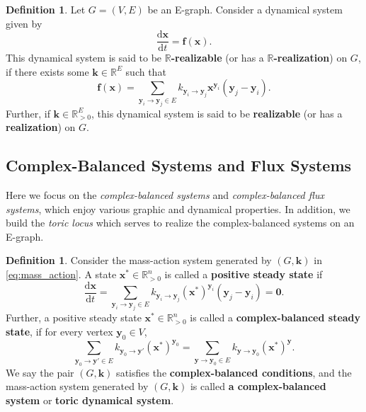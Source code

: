 \documentclass[11pt]{article}
\theoremstyle{plain}
\theoremstyle{definition}
\newtheorem{definition}[theorem]{Definition}
\theoremstyle{remark}
\newcommand\RR{\mathbb{R}}
\newcommand\by{\boldsymbol{y}}
\renewcommand\bf{\boldsymbol{f}}
\newcommand\bk{\boldsymbol{k}}
\newcommand\bx{\boldsymbol{x}}
\newcommand{\defi}{\textbf}
\begin{document}
\begin{definition} 
\label{def:mas_realizable}
Let $G=(V, E)$ be an E-graph.
Consider a dynamical system given by
\begin{equation} \label{eq:realization_ode}
\frac{\mathrm{d} \bx}{\mathrm{d} t} 
= \bf (\bx).
\end{equation}
This dynamical system is said to be \defi{$\RR$-realizable} (or has a \defi{$\RR$-realization}) on $G$, if there exists some $\bk \in \mathbb{R}^{E}$ such that
\begin{equation} \label{eq:realization}
\bf (\bx) =
\sum_{\by_i \rightarrow \by_j \in E}k_{\by_i \rightarrow \by_j} \bx^{\by_i}(\by_j - \by_i).
\end{equation}
Further, if $\bk \in \mathbb{R}^{E}_{>0}$, this dynamical system is said to be \defi{realizable} (or has a \defi{realization}) on $G$.
\end{definition}

\subsection{Complex-Balanced Systems and Flux Systems}
\label{sec:complex_balanced}

Here we focus on the \emph{complex-balanced systems} and \emph{complex-balanced flux systems}, which enjoy various graphic and dynamical properties. In addition, we build the \emph{toric locus} which serves to realize the complex-balanced systems on an E-graph.

\begin{definition} 
\label{def:cb_system}
Consider the mass-action system generated by $(G, \bk)$ in \eqref{eq:mass_action}.
A state $\bx^* \in \mathbb{R}_{>0}^n$ is called a \defi{positive steady state} if 
\begin{equation} 
\frac{\mathrm{d} \bx}{\mathrm{d} t} 
= \sum_{\by_i \rightarrow \by_j \in E}k_{\by_i \rightarrow \by_j} (\bx^*)^{\by_i}(\by_j - \by_i)
= \mathbf{0}.
\end{equation}
Further, a positive steady state $\bx^* \in \RR_{>0}^n$ is called a \defi{complex-balanced steady state}, if for every vertex $\by_0 \in V$,
\begin{equation} 
\sum_{\by_0 \to \by' \in E} k_{\by_0 \to \by'} (\bx^*)^{\by_0}
= \sum_{\by \to \by_0 \in E} k_{\by \to \by_0}
(\bx^*)^{\by}.
\end{equation}
We say the pair $(G, \bk)$ satisfies the \defi{complex-balanced conditions}, and the mass-action system generated by $(G, \bk)$ is called \defi{a complex-balanced system} or \defi{toric dynamical system}. 
\end{definition}
\end{document}
